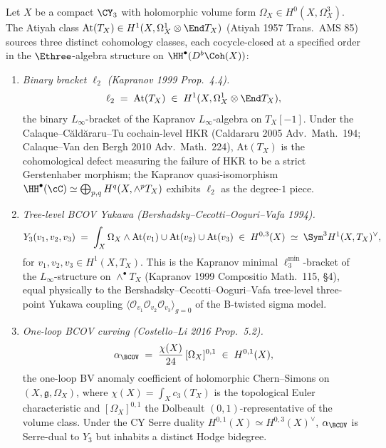 \begin{theorem}
\label{thm:three-atiyah-cocycles}
Let $X$ be a compact $\CY_3$ with holomorphic volume form $\Omega_X \in H^0(X, \Omega^3_X)$. The Atiyah class $\mathrm{At}(T_X) \in H^1(X, \Omega^1_X \otimes \End T_X)$ (Atiyah 1957 Trans.\ AMS 85) sources three distinct cohomology classes, each cocycle-closed at a specified order in the $\Ethree$-algebra structure on $\HH^\bullet(D^b\Coh(X))$:
\begin{enumerate}[label=(\roman*)]
\item \emph{Binary bracket $\ell_2$ (Kapranov 1999 Prop.~4.4).}
\begin{equation}
\label{eq:atiyah-ell2}
\ell_2 \;=\; \mathrm{At}(T_X) \;\in\; H^1(X, \Omega^1_X \otimes \End T_X),
\end{equation}
the binary $L_\infty$-bracket of the Kapranov $L_\infty$-algebra on $T_X[-1]$. Under the Calaque--C\u ald\u araru--Tu cochain-level HKR (Caldararu 2005 Adv.\ Math.\ 194; Calaque--Van den Bergh 2010 Adv.\ Math.\ 224), $\mathrm{At}(T_X)$ is the cohomological defect measuring the failure of HKR to be a strict Gerstenhaber morphism; the Kapranov quasi-isomorphism $\HH^\bullet(\cC) \simeq \bigoplus_{p,q} H^q(X, \wedge^p T_X)$ exhibits $\ell_2$ as the degree-$1$ piece.
\item \emph{Tree-level BCOV Yukawa (Bershadsky--Cecotti--Ooguri--Vafa 1994).}
\begin{equation}
\label{eq:atiyah-Y3}
Y_3(v_1, v_2, v_3) \;=\; \int_X \Omega_X \wedge \mathrm{At}(v_1) \cup \mathrm{At}(v_2) \cup \mathrm{At}(v_3) \;\in\; H^{0,3}(X) \;\simeq\; \Sym^3 H^1(X, T_X)^\vee,
\end{equation}
for $v_1, v_2, v_3 \in H^1(X, T_X)$. This is the Kapranov minimal $\ell_3^{\min}$-bracket of the $L_\infty$-structure on $\wedge^\bullet T_X$ (Kapranov 1999 Compositio Math.\ 115, \S4), equal physically to the Bershadsky--Cecotti--Ooguri--Vafa tree-level three-point Yukawa coupling $\langle \mathcal O_{v_1} \mathcal O_{v_2} \mathcal O_{v_3} \rangle_{g=0}$ of the B-twisted sigma model.
\item \emph{One-loop BCOV curving (Costello--Li 2016 Prop.~5.2).}
\begin{equation}
\label{eq:atiyah-alpha-bcov}
\alpha_{\BCOV} \;=\; \frac{\chi(X)}{24}\, [\Omega_X]^{0,1} \;\in\; H^{0,1}(X),
\end{equation}
the one-loop BV anomaly coefficient of holomorphic Chern--Simons on $(X, \mathfrak g, \Omega_X)$, where $\chi(X) = \int_X c_3(T_X)$ is the topological Euler characteristic and $[\Omega_X]^{0,1}$ the Dolbeault $(0,1)$-representative of the volume class. Under the CY Serre duality $H^{0,1}(X) \simeq H^{0,3}(X)^\vee$, $\alpha_{\BCOV}$ is Serre-dual to $Y_3$ but inhabits a distinct Hodge bidegree.

\end{enumerate}
\end{theorem}
